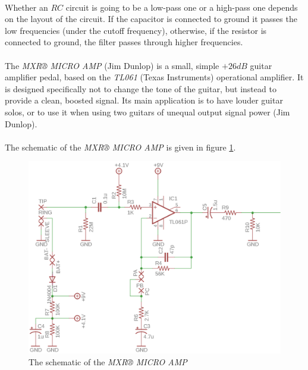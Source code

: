 \documentclass[a4paper, 12pt]{article}
\begin{document}
\paragraph*{}
Whether an $RC$ circuit is going to be a low-pass one or a high-pass one 
depends on the layout of the circuit. If the capacitor is connected to ground 
it passes the low frequencies (under the cutoff frequency), otherwise, if the 
resistor is connected to ground, the filter passes through higher frequencies.

\paragraph*{}
The \textit{MXR® MICRO AMP} (Jim Dunlop) is a small, simple $+26\si{dB}$ 
guitar amplifier pedal, based on the \textit{TL061} (Texas Instruments) 
operational amplifier. It is designed specifically not to change the tone of 
the guitar, but instead to provide a clean, boosted signal. Its main 
application is to have louder guitar solos, or to use it when using two 
guitars of unequal output signal power (Jim Dunlop).

\paragraph*{}
The schematic of the \textit{MXR® MICRO AMP} is given in figure 
\ref{fig:mxr_schematic}.
\begin{figure}[ht] 
	\centering
	\includegraphics{img/mxr-schematic}
	\caption{The schematic of the \textit{MXR® MICRO AMP}}
	\label{fig:mxr_schematic}
\end{figure}
\end{document}
